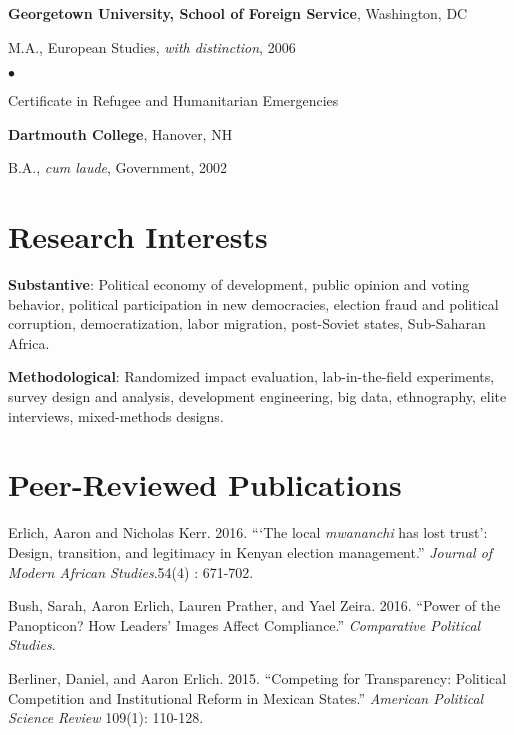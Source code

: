 \documentclass[margin,line]{res}
\newenvironment{list1}{
  \begin{list}{\ding{113}}{%
      \setlength{\itemsep}{0in}
      \setlength{\parsep}{0in} \setlength{\parskip}{0in}
      \setlength{\topsep}{0in} \setlength{\partopsep}{0in} 
      \setlength{\leftmargin}{0.17in}}}{\end{list}}
\newenvironment{list2}{
  \begin{list}{$\bullet$}{%
      \setlength{\itemsep}{0in}
      \setlength{\parsep}{0in} \setlength{\parskip}{0in}
      \setlength{\topsep}{0in} \setlength{\partopsep}{0in} 
      \setlength{\leftmargin}{0.2in}}}{\end{list}}
\begin{document}
{\begin{resume}
{\bf Georgetown University, School of Foreign Service}, Washington, DC \\
\vspace*{-.1in}
\begin{list1}
\item[] M.A., European Studies, \emph{with distinction},  2006
  \begin{list2}
\item[] Certificate in Refugee and Humanitarian Emergencies

\end{list2}
\end{list1}

{\bf Dartmouth College}, Hanover, NH\\
\vspace*{-.1in}
\begin{list1}
\item[] B.A., \emph{cum laude}, Government,  2002
\end{list1}

\section{\sc Research Interests}
\textbf{Substantive}: Political economy of development, public opinion
and voting behavior, political participation in new
democracies, election fraud and
political corruption, democratization,  labor migration, post-Soviet states, Sub-Saharan Africa.

\textbf{Methodological}: Randomized impact evaluation,
lab-in-the-field experiments, survey design and analysis, development engineering, big data, ethnography, elite
interviews, mixed-methods designs.

\section{\sc Peer-Reviewed Publications}
 Erlich, Aaron and Nicholas Kerr. 2016. ``‘The local
  \emph{mwananchi} has lost trust’: Design, transition, and legitimacy
  in Kenyan election management.'' \emph{Journal of Modern African
    Studies}.54(4) : 671-702.

Bush, Sarah, Aaron Erlich, Lauren Prather, and Yael
Zeira. 2016. ``Power of the Panopticon? How Leaders' Images Affect Compliance.''
\emph{Comparative Political Studies}.

Berliner, Daniel,  and Aaron Erlich. 2015. ``Competing for
Transparency: Political Competition and Institutional Reform in
Mexican States.'' \emph{American Political Science Review} 109(1): 110-128.


\end{resume}}
\end{document}
